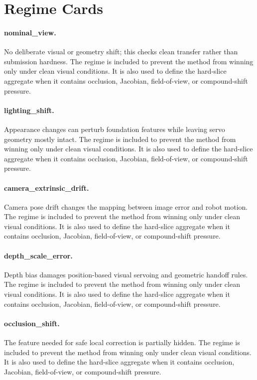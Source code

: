 \documentclass{article}
\begin{document}
\section{Regime Cards}
\paragraph{nominal\_view.} No deliberate visual or geometry shift; this checks clean transfer rather than submission hardness.
The regime is included to prevent the method from winning only under clean visual conditions. It is also used to define the hard-slice aggregate when it contains occlusion, Jacobian, field-of-view, or compound-shift pressure.
\paragraph{lighting\_shift.} Appearance changes can perturb foundation features while leaving servo geometry mostly intact.
The regime is included to prevent the method from winning only under clean visual conditions. It is also used to define the hard-slice aggregate when it contains occlusion, Jacobian, field-of-view, or compound-shift pressure.
\paragraph{camera\_extrinsic\_drift.} Camera pose drift changes the mapping between image error and robot motion.
The regime is included to prevent the method from winning only under clean visual conditions. It is also used to define the hard-slice aggregate when it contains occlusion, Jacobian, field-of-view, or compound-shift pressure.
\paragraph{depth\_scale\_error.} Depth bias damages position-based visual servoing and geometric handoff rules.
The regime is included to prevent the method from winning only under clean visual conditions. It is also used to define the hard-slice aggregate when it contains occlusion, Jacobian, field-of-view, or compound-shift pressure.
\paragraph{occlusion\_shift.} The feature needed for safe local correction is partially hidden.
The regime is included to prevent the method from winning only under clean visual conditions. It is also used to define the hard-slice aggregate when it contains occlusion, Jacobian, field-of-view, or compound-shift pressure.
\end{document}
